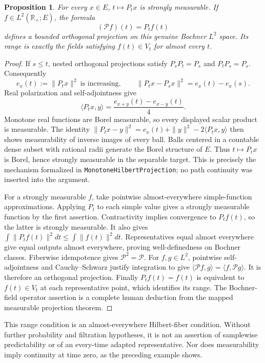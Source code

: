 \documentclass[11pt]{article}
\newtheorem{proposition}[theorem]{Proposition}
\newcommand{\R}{\mathbb R}\newcommand{\E}{\mathbb E}
\newcommand{\code}[1]{{\small\nolinkurl{#1}}}
\begin{document}
\begin{proposition}\label{prop:pastmeasurable}
For every $x\in E$, $t\mapsto P_tx$ is strongly measurable. If
$f\in L^2(\R_+;E)$, the formula
\[
 (\mathcal Pf)(t)=P_tf(t)
\]
defines a bounded orthogonal projection on this genuine Bochner
$L^2$ space. Its range is exactly the fields satisfying
$f(t)\in V_t$ for almost every $t$.
\end{proposition}
\begin{proof}
If $s\le t$, nested orthogonal projections satisfy $P_sP_t=P_s$
and $P_tP_s=P_s$. Consequently
\[
 e_x(t):=\|P_tx\|^2\ \text{is increasing},\qquad
 \|P_tx-P_sx\|^2=e_x(t)-e_x(s).
\]
Real polarization and self-adjointness give
\[
 \langle P_tx,y\rangle
   =\frac{e_{x+y}(t)-e_{x-y}(t)}4.
\]
Monotone real functions are Borel measurable, so every displayed
scalar product is measurable. The identity
$\|P_tx-y\|^2=e_x(t)+\|y\|^2-2\langle P_tx,y\rangle$ then shows
measurability of inverse images of every ball. Balls centered in
a countable dense subset with rational radii generate the Borel
structure of $E$. Thus $t\mapsto P_tx$ is Borel, hence strongly
measurable in the separable target. This is precisely the mechanism
formalized in \code{MonotoneHilbertProjection}; no path continuity
was inserted into the argument.

For a strongly measurable $f$, take pointwise almost-everywhere
simple-function approximations. Applying $P_t$ to each simple value
gives a strongly measurable function by the first assertion.
Contractivity implies convergence to $P_tf(t)$, so the latter is
strongly measurable. It also gives
$\int\|P_tf(t)\|^2dt\le\int\|f(t)\|^2dt$. Representatives equal
almost everywhere give equal outputs almost everywhere, proving
well-definedness on Bochner classes. Fiberwise idempotence gives
$\mathcal P^2=\mathcal P$. For $f,g\in L^2$, pointwise
self-adjointness and Cauchy--Schwarz justify integration to give
$\langle\mathcal Pf,g\rangle=\langle f,\mathcal Pg\rangle$.
It is therefore an orthogonal projection. Finally $P_tf(t)=f(t)$
is equivalent to $f(t)\in V_t$ at each representative point, which
identifies its range. The Bochner-field operator assertion is a
complete human deduction from the mapped measurable projection
theorem.
\end{proof}

This range condition is an almost-everywhere Hilbert-fiber
condition. Without further probability and filtration hypotheses,
it is not an assertion of samplewise predictability or of an
every-time adapted representative. Nor does measurability imply
continuity at time zero, as the preceding example shows.
\end{document}
